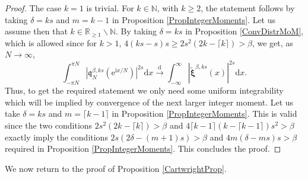 \documentclass[]{article}
\begin{document}
\begin{proof} The case $k=1$ is trivial. For $k\in \mathbb{N}$, with $k\ge 2$, the statement follows by taking $\delta=ks$ and $m=k-1$ in Proposition \ref{PropIntegerMoments}. Let us assume then that $k\in \mathbb{R}_{\ge 1} \backslash \mathbb{N}$. By taking $\delta=ks$ in Proposition \ref{ConvDistrMoM}, which is allowed since for $k>1$, $4(ks-s)s\ge 2s^2(2k-\lceil k \rceil)>\beta$, we get, as $N \to \infty$,
\begin{equation*}
\int_{-\pi N}^{\pi N}\left|\mathfrak{q}_N^{\beta,ks}(\mathrm{e}^{\mathrm{i}x/N})\right|^{2s}\mathrm{d}x\overset{\mathrm{d}}{\longrightarrow}\int_{-\infty}^{\infty}\left|\tilde{\boldsymbol{\xi}}^{\beta,ks}(x)\right|^{2s}\mathrm{d}x.
\end{equation*} 
Thus, to get the required statement we only need some uniform integrability which will be implied by convergence of the next larger integer moment. Let us take $\delta=ks$ and $m=\lceil k-1 \rceil$ in Proposition \ref{PropIntegerMoments}. This is valid since the two conditions $2s^2(2k-\lceil k \rceil)>\beta$ and $4\lceil k-1\rceil(k-\lceil k-1\rceil)s^2>\beta$ exactly imply the conditions $2s(2\delta-(m+1)s)>\beta$ and $4m(\delta-m s)s>\beta$ required in Proposition \ref{PropIntegerMoments}. This concludes the proof.
\end{proof}

We now return to the proof of Proposition \ref{CartwrightProp}.
\end{document}
